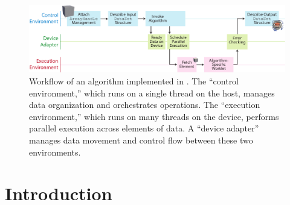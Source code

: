 

\begin{figure}[tb]
  \includegraphics[width=\textwidth]{figures/vtkm-workflow}
  \caption{
    Workflow of an algorithm implemented in \vtkm.
    The ``control environment,'' which runs on a single thread on the host, manages data organization and orchestrates operations.
    The ``execution environment,'' which runs on many threads on the device, performs parallel execution across elements of data.
    A ``device adapter'' manages data movement and control flow between these two environments.
  }
  \label{fig:vtkm-workflow}
\end{figure}


\section{Introduction}




